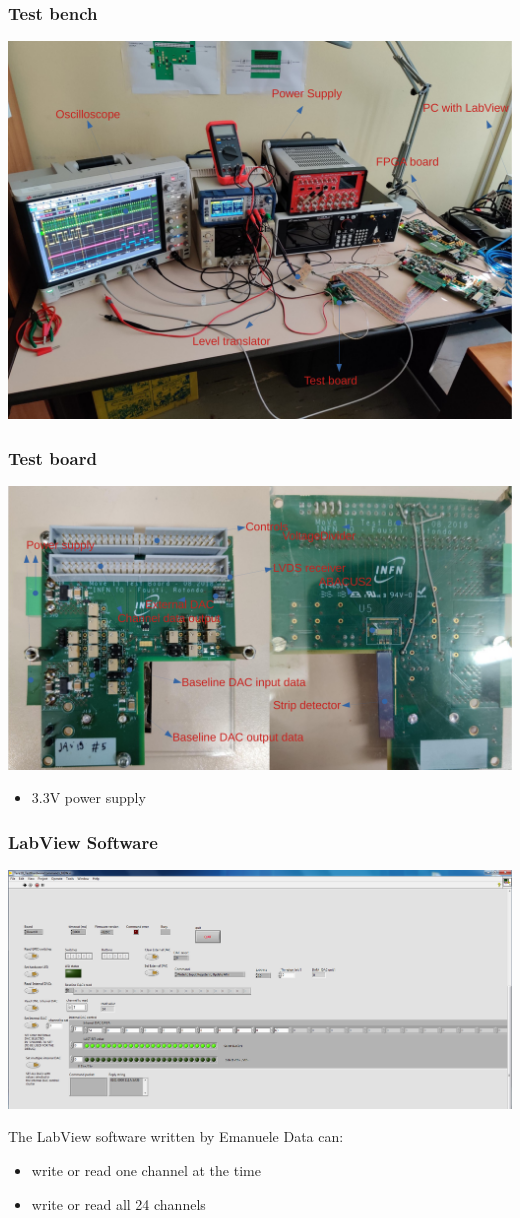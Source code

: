 \documentclass[aspectratio=169]{beamer}
\begin{document}
	\begin{frame}
	\frametitle{Test bench}
	\begin{center}
		\includegraphics[width=0.65 \textwidth]{IMG/TestBench.pdf}
	\end{center}
	\end{frame}

	\begin{frame}
	\frametitle{Test board}
	\begin{center}
		\includegraphics[width=0.7 \textwidth]{IMG/TestBoard.pdf}
	\end{center}
	\begin{itemize}
		\item 3.3V power supply
	\end{itemize}
	\end{frame}

	\begin{frame}
	\frametitle{LabView Software}
	\begin{center}
		\includegraphics[width=0.7 \textwidth]{IMG/LabVIEWBaselineDac.PNG}
	\end{center}
	The LabView software written by Emanuele Data can:
	\begin{itemize}
		\item write or read one channel at the time
		\item write or read all 24 channels
	\end{itemize}
	
	\end{frame}
\end{document}
